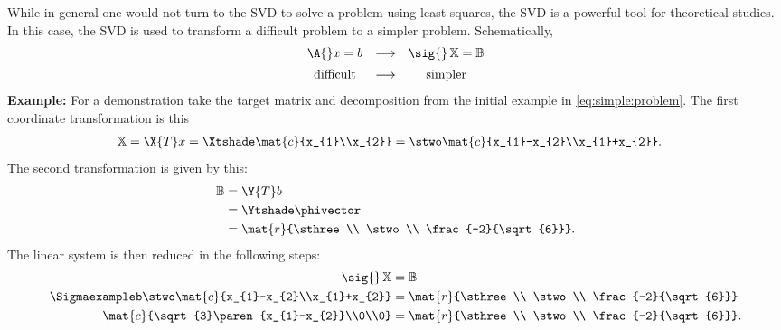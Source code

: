 While in general one would not turn to the SVD to solve a problem using least squares, the SVD is a powerful tool for theoretical studies. In this case, the SVD is used to transform a difficult problem to a simpler problem. Schematically,
$$
\begin{array}{ ccc }
  \A{} x = b  & \longrightarrow  &  \sig{}\, \mathbb{X} = \mathbb{B} \\[5pt]
   \text{difficult}  & \longrightarrow  &  \text{simpler}  \\
\end{array}
$$
\textbf{Example:} 
For a demonstration take the target matrix and decomposition from the initial example in \eqref{eq:simple:problem}. The first coordinate transformation is this
\begin{equation}
  \begin{split}
    \mathbb{X} & = \X{T} x = \Xtshade \mat{c}{x_{1}\\x_{2}} = \stwo \mat{c}{x_{1}-x_{2}\\x_{1}+x_{2}}.
  \end{split}
\end{equation}
The second transformation is given by this:
\begin{equation}
  \begin{split}
    \mathbb{B} & = \Y{T} b \\
    &= \Ytshade \phivector \\
    &= \mat{r}{\sthree \\ \stwo \\ \frac{-2}{\sqrt{6}}}.
  \end{split}
\end{equation}
The linear system is then reduced in the following steps:
\begin{equation}
  \begin{split}
    \sig{}\,\mathbb{X} &= 
    \mathbb{B} \\
    \Sigmaexampleb \stwo 
    \mat{c}{x_{1}-x_{2}\\x_{1}+x_{2}} & = 
    \mat{r}{\sthree \\ \stwo \\ \frac{-2}{\sqrt{6}}}\\
    \mat{c}{\sqrt{3}\paren{x_{1}-x_{2}}\\0\\0} &= 
    \mat{r}{\sthree \\ \stwo \\ \frac{-2}{\sqrt{6}}}.
  \end{split}
\end{equation}
